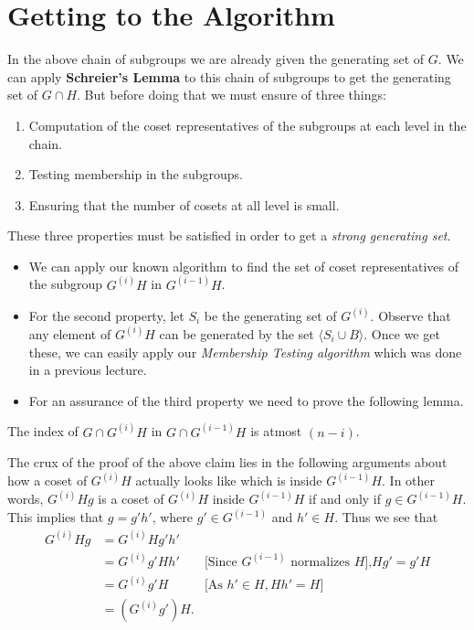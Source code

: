 \section{Getting to the Algorithm }
In the above chain of subgroups we are already given the generating set of $G$. We can apply {\bf Schreier's Lemma} to this chain of subgroups to get the generating set of $G\cap H$. But before doing that we must ensure of three things:
\begin{enumerate}
	\item Computation of the coset representatives of the subgroups at each level in the chain.
	\item Testing membership in the subgroups.
	\item Ensuring that the number of cosets at all level is small.
\end{enumerate}
These three properties must be satisfied in order to get a \emph{strong generating set}. 
\begin{itemize}
	\item We can apply our known algorithm to find the set of coset representatives of the subgroup $G^{(i)}H$ in $G^{(i-1)}H$.
	\item For the second property, let $S_i$ be the generating set of $G^{(i)}$. Observe that any element of $G^{(i)}H$ can be generated by the set $\langle S_i \cup B\rangle$. Once we get these, we can easily apply our \emph{Membership Testing algorithm} which was done in a previous lecture.
	\item For an assurance of the third property we need to prove the following lemma.
\end{itemize}
\begin{claim}\label{coset}
	The index of 
	$G\cap G^{(i)}H$ in $G\cap G^{(i-1)}H$  is atmost $(n-i)$.
\end{claim}
The crux of the proof of the above claim lies in the following arguments about how a coset of $G^{(i)}H$ actually looks like which is inside $G^{(i-1)}H$. In other words, $G^{(i)}Hg$ is a coset of $G^{(i)}H$ inside $G^{(i-1)}H$ if and only if $g\in G^{(i-1)}H$. This implies that $g = g'h'$, where $g'\in G^{(i-1)}$ and $h'\in H$. Thus we see that 
\begin{eqnarray*}
	G^{(i)}Hg &= G^{(i)}Hg'h'\\
			  &= G^{(i)}g'Hh' & \text{[Since $G^{(i-1)}$ normalizes $H$],$Hg'=g'H$}\\
			  &= G^{(i)}g'H & \text{[As $h'\in H , Hh' = H$]}\\
			  &= (G^{(i)}g')H.
\end{eqnarray*}
